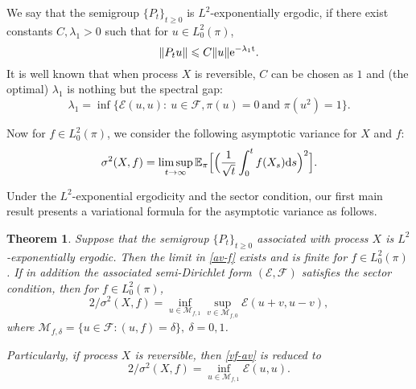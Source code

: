 \documentclass[12pt,reqno]{article}
\newtheorem{thm}{Theorem}[section]
\theoremstyle{definition}
\theoremstyle{remark}
\theoremstyle{example}
\numberwithin{equation}{section}
\newcommand{\scr}[1]{\mathscr #1}
\def\d{\mathrm{d}}
\def\e{\scr E}
\def\bE{\mathbb E}
\def\d{\rm d}
\def\bg{\begin}
\def\be{\bg{equation}}
\def\de{\end{equation}}
\def\lb{\label}
\def\d{{\mbox{\rm d}}}
\begin{document}

We say that  the semigroup $\{P_t\}_{t\geq0}$ is $L^2$-exponentially ergodic, if there exist constants $C, \lambda_1>0$ such that for  $u\in L_0^2(\pi)$,
$$
\|P_tu\|\leqslant C\|u\|\rm{e}^{-\lambda_1 t}.
$$
It is well known  that when process $X$ is reversible,
$C$ can be chosen as $1$ and (the optimal) $\lambda_1$ is nothing but  the spectral gap:
\begin{equation}\lb{spec-gap}
\lambda_1=\inf\{\e(u,u):\ u\in\scr{F},\pi(u)=0\ \text{and }\pi(u^2)=1\}.
\end{equation}




Now for $f\in L^2_0(\pi)$, we consider the following asymptotic variance for $X$ and $f$:
\be\lb{av-f}
\sigma^2(X,f)=\limsup_{t\rightarrow\infty}\bE_\pi\Big[\Big(\frac{1}{\sqrt{t}}\int_0^tf(X_s)\d s\Big)^2\Big].
\de

Under the $L^2$-exponential ergodicity and the sector condition, our first main result presents a variational formula for the asymptotic variance as follows.

\begin{thm}\lb{main1}
Suppose that the semigroup $\{P_t\}_{t\geq0}$ associated with process $X$ is
$L^2$-exponentially ergodic. Then the limit in \eqref{av-f} exists and is finite for  $f\in L^2_0(\pi)$. If in addition the associated semi-Dirichlet form $(\e,\scr{F})$ satisfies the sector condition, then for $f\in L^2_0(\pi)$,
\begin{equation}\lb{vf-av}
2/\sigma^2(X,f)=\inf_{u\in\scr{M}_{f,1}}\sup_{v\in\scr{M}_{f,0}}\e(u+v,u-v),
\end{equation}
where $\scr{M}_{f,\delta}=\{u\in\scr{F}:(u,f)=\delta\},\ \delta=0,1$.

Particularly, if process $X$ is reversible, then \eqref{vf-av} is reduced to
\begin{equation}\lb{vf-av-r}
2/\sigma^2(X,f)=\inf_{u\in\scr{M}_{f,1}}\e(u,u).
\end{equation}
\end{thm}
\end{document}
